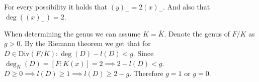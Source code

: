 \documentclass[12pt, a4paper]{article}
\begin{document}
For every possibility it holds that $(y)_{-} = 2(x)_{-}$. And also that $\deg((x)_{-})=2$.


When determining the genus we can assume $K = \bar{K}$. Denote the genus of $F/K$ as $g > 0$. By the Riemann theorem we get that for $D \in \text{Div}(F/K): \deg(D) - l(D) < g$. Since $\deg_{\bar{K}}(D) = [F:K(x)] = 2 \implies 2 - l(D) < g$. $D \geq 0 \implies l(D) \geq 1 \implies l(D) \geq 2-g$. Therefore $g = 1$ or $g=0$.  
\end{document}
